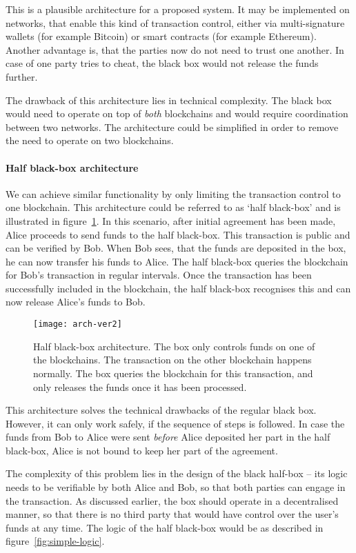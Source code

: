 This is a plausible architecture for a proposed system. It may be implemented on networks, that enable this kind of transaction control, either via multi-signature wallets (for example Bitcoin) or smart contracts (for example Ethereum). Another advantage is, that the parties now do not need to trust one another. In case of one party tries to cheat, the black box would not release the funds further.

The drawback of this architecture lies in technical complexity. The black box would need to operate on top of \textit{both} blockchains and would require coordination between two networks. The architecture could be simplified in order to remove the need to operate on two blockchains.

\paragraph{Half black-box architecture}
We can achieve similar functionality by only limiting the transaction control to one blockchain. This architecture could be referred to as `half black-box' and is illustrated in figure~\ref{fig:arch-ver2}. In this scenario, after initial agreement has been made, Alice proceeds to send funds to the half black-box. This transaction is public and can be verified by Bob. When Bob sees, that the funds are deposited in the box, he can now transfer his funds to Alice. The half black-box queries the blockchain for Bob's transaction in regular intervals. Once the transaction has been successfully included in the blockchain, the half black-box recognises this and can now release Alice's funds to Bob.
% 
\begin{figure}[ht]
    \centering
    \texttt{[image: arch-ver2]}
    \caption{Half black-box architecture. The box only controls funds on one of the blockchains. The transaction on the other blockchain happens normally. The box queries the blockchain for this transaction, and only releases the funds once it has been processed.}
    \label{fig:arch-ver2}
\end{figure}

This architecture solves the technical drawbacks of the regular black box. However, it can only work safely, if the sequence of steps is followed. In case the funds from Bob to Alice were sent \textit{before} Alice deposited her part in the half black-box, Alice is not bound to keep her part of the agreement.

The complexity of this problem lies in the design of the black half-box -- its logic needs to be verifiable by both Alice and Bob, so that both parties can engage in the transaction. As discussed earlier, the box should operate in a decentralised manner, so that there is no third party that would have control over the user's funds at any time. The logic of the half black-box would be as described in figure~\ref{fig:simple-logic}.


